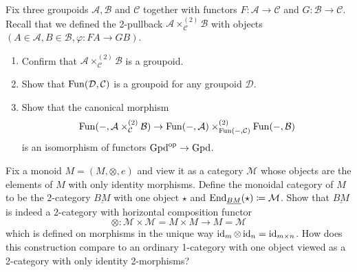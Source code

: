 \begin{Exercise}
	Fix three groupoids $ \mathcal{ A } , \mathcal{ B } $ and $ \mathcal{ C } $ together with functors $ F \colon \mathcal{ A } \to \mathcal{ C } $ and $ G \colon \mathcal{ B } \to \mathcal{ C } $.
	Recall that we defined the 2-pullback $ \mathcal{ A } \times_{ \mathcal{ C } }^{ ( 2 ) } \mathcal{ B } $ with objects $ ( A \in \mathcal{ A } , B \in \mathcal{ B } , \varphi \colon FA \to GB )$.
	
	\begin{enumerate}[label=(\alph*)]
		\item 
		Confirm that $ \mathcal{ A } \times_{ \mathcal{ C } }^{ ( 2 ) } \mathcal{ B } $ is a groupoid.
		
		\item 
		Show that $ \operatorname{Fun} ( \mathcal{ D } , \mathcal{ C } ) $ is a groupoid for any groupoid $ \mathcal{ D } $.
		
		\item 
		Show that the canonical morphism 
		\[
		\operatorname{Fun} ( - , \mathcal{ A } \times_{ \mathcal{ C } }^{ ( 2 ) } \mathcal{ B } ) 
		\to
		\operatorname{Fun} ( - , \mathcal{ A } ) \times_{ \operatorname{Fun} ( - , \mathcal{ C } )} ^{(2)} \operatorname{Fun} ( - , \mathcal{ B } )
		\]
		is an isomorphism of functors $ \operatorname{Gpd}^{ \operatorname{op} } \to \operatorname{Gpd}$.
	\end{enumerate}
\end{Exercise}

\begin{Exercise}
	Fix a monoid $ M = ( M , \otimes , e ) $ and view it as a category $ \mathcal{ M } $ whose objects are the elements of $ M $ with only identity morphisms.
	Define the monoidal category of $ M $ to be the 2-category $ \underline{ BM } $ with one object $ \star $ and $ \operatorname{End}_{ \underline{ BM } } ( \star ) \coloneqq \mathcal{ M } $.
	Show that $ \underline{ BM } $ is indeed a 2-category with horizontal composition functor
	\[
	\otimes \colon \mathcal{ M } \times  \mathcal{ M } = M \times M \to M = \mathcal{ M }
	\]
	which is defined on morphisms in the unique way $ \operatorname{id}_m \otimes \operatorname{id}_n = \operatorname{id}_{ m \times n } $.
	How does this construction compare to an ordinary 1-category with one object viewed as a 2-category with only identity 2-morphisms?
\end{Exercise}

